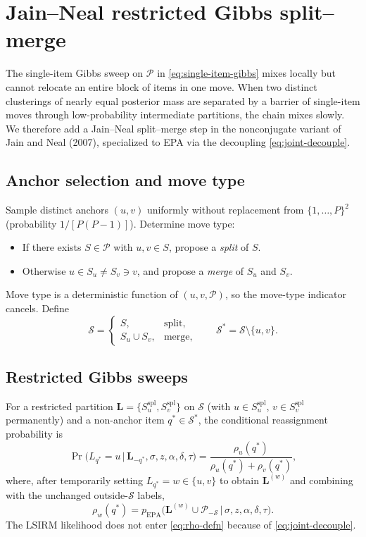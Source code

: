 \documentclass[11pt]{article}
\DeclareMathOperator{\EPA}{EPA}
\begin{document}
\section{Jain--Neal restricted Gibbs split--merge}
\label{sec:sm}

The single-item Gibbs sweep on $\mathcal{P}$ in
\eqref{eq:single-item-gibbs} mixes locally but cannot relocate an entire
block of items in one move.  When two distinct clusterings of nearly equal
posterior mass are separated by a barrier of single-item moves through
low-probability intermediate partitions, the chain mixes slowly.  We
therefore add a Jain--Neal split--merge step in the nonconjugate variant of
Jain and Neal (2007), specialized to EPA via the decoupling
\eqref{eq:joint-decouple}.

\subsection{Anchor selection and move type}

Sample distinct anchors $(u,v)$ uniformly without replacement from
$\{1,\dots,P\}^2$ (probability $1/[P(P-1)]$).  Determine move type:
\begin{itemize}
\item If there exists $S\in\mathcal{P}$ with $u,v\in S$, propose a
  \emph{split} of $S$.
\item Otherwise $u\in S_u\ne S_v\ni v$, and propose a \emph{merge} of $S_u$
  and $S_v$.
\end{itemize}
Move type is a deterministic function of $(u,v,\mathcal{P})$, so the
move-type indicator cancels.  Define
\begin{equation}
    \mathcal{S}=\begin{cases}S,&\text{split,}\\ S_u\cup S_v,&\text{merge,}\end{cases}
    \qquad\mathcal{S}^*=\mathcal{S}\setminus\{u,v\}.
\end{equation}

\subsection{Restricted Gibbs sweeps}

For a restricted partition
$\mathbf{L}=\{S^{\mathrm{spl}}_u,S^{\mathrm{spl}}_v\}$ on $\mathcal{S}$ (with
$u\in S^{\mathrm{spl}}_u$, $v\in S^{\mathrm{spl}}_v$ permanently) and a
non-anchor item $q^*\in\mathcal{S}^*$, the conditional reassignment
probability is
\begin{equation}
    \Pr\bigl(L_{q^*}=u\,\big|\,\mathbf{L}_{-q^*},\sigma,z,\alpha,\delta,\tau\bigr)
    =\frac{\rho_u(q^*)}{\rho_u(q^*)+\rho_v(q^*)},
    \label{eq:rgibbs-cond}
\end{equation}
where, after temporarily setting $L_{q^*}=w\in\{u,v\}$ to obtain
$\mathbf{L}^{(w)}$ and combining with the unchanged outside-$\mathcal{S}$
labels,
\begin{equation}
    \rho_w(q^*)
    =p_{\EPA}\bigl(\mathbf{L}^{(w)}\cup\mathcal{P}_{-\mathcal{S}}\,\big|\,\sigma,z,\alpha,\delta,\tau\bigr).
    \label{eq:rho-defn}
\end{equation}
The LSIRM likelihood does not enter \eqref{eq:rho-defn} because of
\eqref{eq:joint-decouple}.
\end{document}

